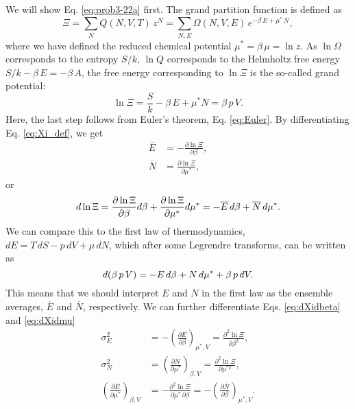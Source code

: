 \documentclass[reprint]{revtex4-1}
\numberwithin{equation}{section}
\begin{document}
We will show Eq. \eqref{eq:prob3-22a} first.
The grand partition function is defined as
\begin{equation}
\Xi
=
  \sum_{N} Q(N, V, T) \, z^N
=
  \sum_{N, E} \Omega(N, V, E) \, e^{-\beta \, E + \mu^* \, N}
,
  \label{eq:Xi_def}
\end{equation}
%
where we have defined the reduced chemical potential $\mu^* = \beta \, \mu = \ln z$.
%
As $\ln \Omega$ corresponds to the entropy $S/k$,
$\ln Q$ corresponds to the Helmholtz free energy $S/k - \beta \, E = -\beta \, A$,
the free energy corresponding to $\ln \Xi$
is the so-called grand potential:
%
\begin{equation}
  \ln \Xi
  = \frac{S}{k} - \beta \, E + \mu^* N
  = \beta \, p \, V
  .
  \label{eq:lnXi}
\end{equation}
Here, the last step follows from Euler's theorem, Eq. \eqref{eq:Euler}.
%
By differentiating Eq. \eqref{eq:Xi_def}, we get
%
\begin{align}
  \overline E &= -\frac{ \partial \ln \Xi } { \partial \beta }
  ,
  \label{eq:dXidbeta}
  \\
  \overline N &= \frac{ \partial \ln \Xi } { \partial \mu^* }
  ,
  \label{eq:dXidmu}
\end{align}
%
or
\begin{equation}
  d \ln \Xi
  =
  \frac{ \partial \ln \Xi } { \partial \beta } d\beta
  +
  \frac{ \partial \ln \Xi } { \partial \mu^* } d\mu^*
  = -\overline E \, d\beta + \overline N \, d\mu^*
  .
  \notag
\end{equation}
%
We can compare this to the first law of thermodynamics,
$dE = T \, dS - p \, dV + \mu \, dN$,
which after some Legrendre transforms, can be written as
%
\begin{equation}
  d(\beta \, p \, V) = -E \, d\beta + N \, d\mu^* + \beta \, p \, dV
  .
  \notag
\end{equation}
This means that we should interpret $E$ and $N$ in the first law
as the ensemble averages, $\overline E$ and $\overline N$, respectively.
%
We can further differentiate Eqs. \eqref{eq:dXidbeta} and \eqref{eq:dXidmu}
%
\begin{align}
  \sigma_E^2
  &=
  -\left( \frac{ \partial \overline E } { \partial \beta } \right)_{\mu^*, V}
  = \frac{ \partial^2 \ln \Xi } { \partial \beta^2 }
  ,
  \label{eq:varE}
  \\
  \sigma_N^2
  &= \left( \frac{ \partial \overline N } { \partial \mu^* } \right)_{\beta, V}
  = \frac{ \partial^2 \ln \Xi } { \partial \mu^{*2} }
  \label{eq:varN}
  ,
  \\
  \left( \frac{ \partial \overline E } { \partial \mu^* } \right)_{\beta, V}
  &= -\frac{ \partial^2 \ln \Xi } { \partial \mu^* \, \partial \beta }
  = - \left( \frac{ \partial \overline N } { \partial \beta } \right)_{\mu^*, V}
  \label{eq:covEN}
  .
\end{align}
\end{document}
